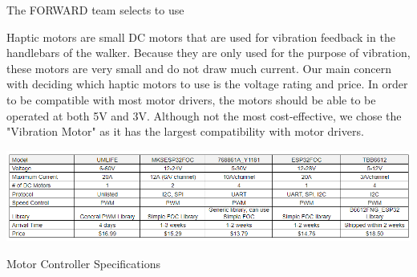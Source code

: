 \noindent The FORWARD team selects to use \\

\begin{table}[H]
	\centering
	\setlength{\tabcolsep}{5pt} %
	\renewcommand{\arraystretch}{1.75} %
	\caption{\label{fig:vibrationMotorSpecifications}Vibration Motor Specifications}
\end{table}

\noindent Haptic motors are small DC motors that are used for vibration feedback in the handlebars of the walker. Because they are only used for the purpose of vibration, these motors are very small and do not draw much current. Our main concern with deciding which haptic motors to use is the voltage rating and price. In order to be compatible with most motor drivers, the motors should be able to be operated at both 5V and 3V. Although not the most cost-effective, we chose the "Vibration Motor" as it has the largest compatibility with motor drivers.\\

\begin{table}[H]
	\centering
	\includegraphics[width=1\textwidth]{./Images/motor_controller_table.png}
	\caption{\label{fig:motor_controller}Motor Controller Specifications}
\end{table}

